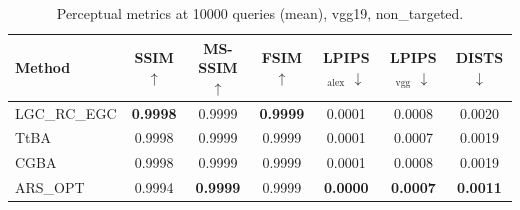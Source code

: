 \begin{table}[t]
\centering\footnotesize
\caption{Perceptual metrics at 10000 queries (mean), vgg19, non\_targeted.}
\begin{tabular}{lcccccc}
\toprule
Method & SSIM $\uparrow$ & MS-SSIM $\uparrow$ & FSIM $\uparrow$ & LPIPS$_{\mathrm{alex}}$ $\downarrow$ & LPIPS$_{\mathrm{vgg}}$ $\downarrow$ & DISTS $\downarrow$ \\
\midrule
LGC\_RC\_EGC & \textbf{0.9998} & 0.9999 & \textbf{0.9999} & 0.0001 & 0.0008 & 0.0020 \\
TtBA & 0.9998 & 0.9999 & 0.9999 & 0.0001 & 0.0007 & 0.0019 \\
CGBA & 0.9998 & 0.9999 & 0.9999 & 0.0001 & 0.0008 & 0.0019 \\
ARS\_OPT & 0.9994 & \textbf{0.9999} & 0.9999 & \textbf{0.0000} & \textbf{0.0007} & \textbf{0.0011} \\
\bottomrule
\end{tabular}
\end{table}

